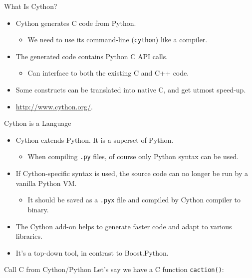 \documentclass[dvips,xcolor=pst,14pt]{beamer}
\begin{document}
\begin{frame}[fragile]{
%
What Is Cython?
%
}
\begin{itemize}
\item Cython generates C code from Python.
\begin{itemize}
  \item We need to use its command-line (\verb+cython+) like a compiler.
\end{itemize}
\item The generated code contains Python C API calls.
\begin{itemize}
  \item Can interface to both the existing \alert{C} and \alert{C++} code.
\end{itemize}
\item Some constructs can be translated into native C, and get utmost speed-up.
\item \url{http://www.cython.org/}.
\end{itemize}
\end{frame}

\begin{frame}[fragile]{
%
Cython is a Language
%
}
\begin{itemize}
\item Cython extends Python.  It is a \alert{superset} of Python.
\begin{itemize}
\item When compiling {\color{red}\verb+.py+} files, of course only Python
syntax can be used.
\end{itemize}
\item If Cython-specific syntax is used, the source code can no longer be run
by a vanilla Python VM.
\begin{itemize}
\item It should be saved as a {\color{red}\verb+.pyx+} file and compiled by
Cython compiler to binary.
\end{itemize}
\item The Cython add-on helps to generate faster code and adapt to various
libraries.
\item It's a top-down tool, in contrast to Boost.Python.
\end{itemize}
\end{frame}

\begin{frame}[fragile]{
%
Call C from Cython/Python
%
}
Let's say we have a C function \verb+caction()+:

\end{frame}
\end{document}
